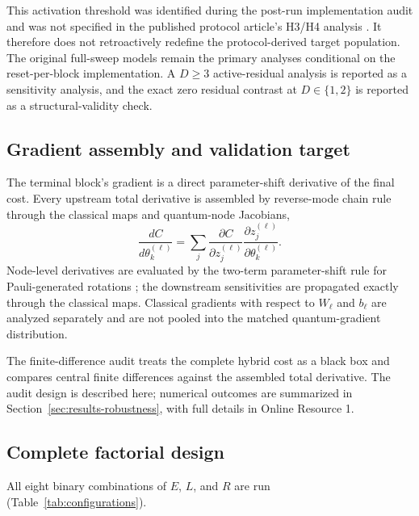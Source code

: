 \documentclass[pdflatex,sn-mathphys-num,Numbered]{sn-jnl}
\begin{document}
This activation threshold was identified during the post-run implementation audit and was not specified in the published protocol article's H3/H4 analysis \cite{shen2026gradient}. It therefore does not retroactively redefine the protocol-derived target population. The original full-sweep models remain the primary analyses conditional on the reset-per-block implementation. A $D\ge3$ active-residual analysis is reported as a sensitivity analysis, and the exact zero residual contrast at $D\in\{1,2\}$ is reported as a structural-validity check.

\subsection{Gradient assembly and validation target}

The terminal block's gradient is a direct parameter-shift derivative of the final cost. Every upstream total derivative is assembled by reverse-mode chain rule through the classical maps and quantum-node Jacobians,
\[
\frac{dC}{d\theta_k^{(\ell)}}
=\sum_j
\frac{\partial C}{\partial z_j^{(\ell)}}
\frac{\partial z_j^{(\ell)}}{\partial\theta_k^{(\ell)}}.
\]
Node-level derivatives are evaluated by the two-term parameter-shift rule for Pauli-generated rotations \cite{mitarai2018quantum,schuld2019evaluating}; the downstream sensitivities are propagated exactly through the classical maps. Classical gradients with respect to $W_\ell$ and $b_\ell$ are analyzed separately and are not pooled into the matched quantum-gradient distribution.

The finite-difference audit treats the complete hybrid cost as a black box and compares central finite differences against the assembled total derivative. The audit design is described here; numerical outcomes are summarized in Section~\ref{sec:results-robustness}, with full details in Online Resource 1.

\subsection{Complete factorial design}

All eight binary combinations of $E$, $L$, and $R$ are run (Table~\ref{tab:configurations}).
\end{document}
